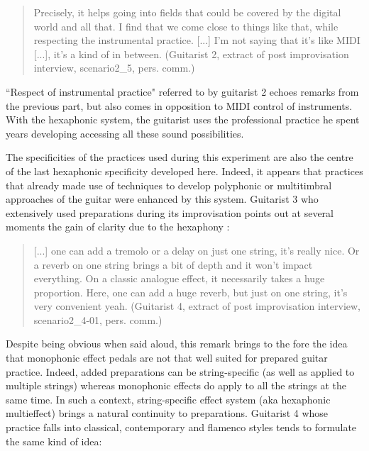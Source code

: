 \documentclass{article}
\begin{document}
\begin{quote}
Precisely, it helps going into fields that could be covered by the digital world and all that.  I find that we come close to things like that, while respecting the instrumental practice.  [...] I'm not saying that it's like MIDI [...], it's a kind of in between.  (Guitarist 2, extract of post improvisation interview, scenario2\_5, pers. comm.)
\end{quote}

``Respect of instrumental practice" referred to by guitarist 2 echoes remarks from the previous part, but also comes in opposition to MIDI control of instruments. With the hexaphonic system, the guitarist uses the professional practice he spent years developing accessing all these sound possibilities.

The specificities of the practices used during this experiment are also the centre of the last hexaphonic specificity developed here. Indeed, it appears that practices that already made use of techniques to develop polyphonic or multitimbral approaches of the guitar were enhanced by this system. 
Guitarist 3 who extensively used preparations during its improvisation points out at several moments the gain of clarity due to the hexaphony : 

\begin{quote}
[...] one can add a tremolo or a delay on just one string, it's really nice. Or a reverb on one string brings a bit of depth and it won't impact everything. On a classic analogue effect, it necessarily takes a huge proportion. Here, one can add a huge reverb, but just on one string, it's very convenient yeah. (Guitarist 4, extract of post improvisation interview, scenario2\_4-01, pers. comm.)
\end{quote}

Despite being obvious when said aloud, this remark brings to the fore the idea that monophonic effect pedals are not that well suited for prepared guitar practice. Indeed, added preparations can be string-specific (as well as applied to multiple strings) whereas monophonic effects do apply to all the strings at the same time.
In such a context, string-specific effect system (aka hexaphonic multieffect) brings a natural continuity to preparations.
Guitarist 4 whose practice falls into classical, contemporary and flamenco styles tends to formulate the same kind of idea: 
\end{document}
